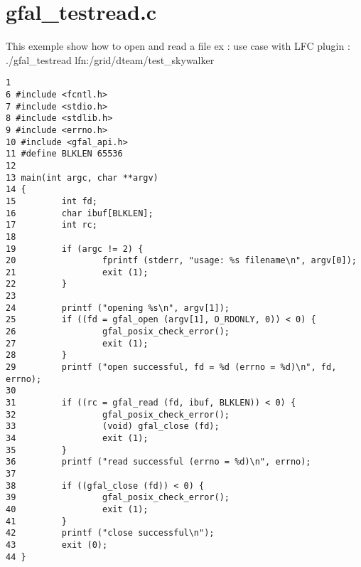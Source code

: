 \section{gfal\_\-testread.c}
This exemple show how to open and read a file ex : use case with LFC plugin : ./gfal\_\-testread lfn:/grid/dteam/test\_\-skywalker



\begin{DocInclude}\begin{verbatim}1 
6 #include <fcntl.h>
7 #include <stdio.h>
8 #include <stdlib.h>
9 #include <errno.h>
10 #include <gfal_api.h>
11 #define BLKLEN 65536
12 
13 main(int argc, char **argv)
14 {
15         int fd;
16         char ibuf[BLKLEN];
17         int rc;
18 
19         if (argc != 2) {
20                 fprintf (stderr, "usage: %s filename\n", argv[0]);
21                 exit (1);
22         }
23 
24         printf ("opening %s\n", argv[1]);
25         if ((fd = gfal_open (argv[1], O_RDONLY, 0)) < 0) {
26                 gfal_posix_check_error();
27                 exit (1);
28         }
29         printf ("open successful, fd = %d (errno = %d)\n", fd, errno);
30 
31         if ((rc = gfal_read (fd, ibuf, BLKLEN)) < 0) {
32                 gfal_posix_check_error();
33                 (void) gfal_close (fd);
34                 exit (1);
35         }
36         printf ("read successful (errno = %d)\n", errno);
37 
38         if ((gfal_close (fd)) < 0) {
39                 gfal_posix_check_error();
40                 exit (1);
41         }
42         printf ("close successful\n");
43         exit (0);
44 }
\end{verbatim}
\end{DocInclude}
 